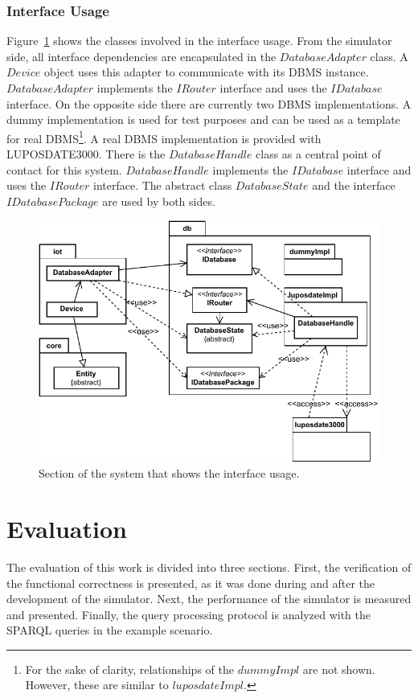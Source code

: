 \documentclass[english,version-2019-11]{uzl-thesis}
\begin{document}
\subsection{Interface Usage}
Figure~\ref{figure_db_interface} shows the classes involved in the interface usage. From the simulator side, all interface dependencies are encapsulated in the $DatabaseAdapter$ class. A $Device$ object uses this adapter to communicate with its DBMS instance. $DatabaseAdapter$ implements the $IRouter$ interface and uses the $IDatabase$ interface. On the opposite side there are currently two DBMS implementations. 
A dummy implementation is used for test purposes and can be used as a template for real DBMS\footnote{For the sake of clarity, relationships of the $dummyImpl$ are not shown. However, these are similar to $luposdateImpl$.}. A real DBMS implementation is provided with LUPOSDATE3000. There is the $DatabaseHandle$ class as a central point of contact for this system. $DatabaseHandle$ implements the $IDatabase$ interface and uses the $IRouter$ interface. The abstract class $DatabaseState$ and the interface $IDatabasePackage$ are used by both sides.
\begin{figure}[htpb]
  \centering
  \includegraphics{figure_db_interface.pdf}
  \caption{Section of the system that shows the interface usage.}
  \label{figure_db_interface}
\end{figure}

\chapter{Evaluation}
The evaluation of this work is divided into three sections. First, the verification of the functional correctness is presented, as it was done during and after the development of the simulator. Next, the performance of the simulator is measured and presented. Finally, the query processing protocol is analyzed with the SPARQL queries in the example scenario.
\end{document}
